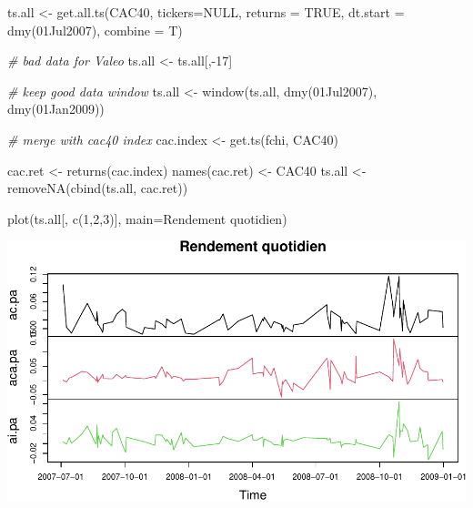 \documentclass[
]{article}
\newenvironment{Shaded}{\begin{snugshade}}{\end{snugshade}}
\newcommand{\AttributeTok}[1]{\textcolor[rgb]{0.77,0.63,0.00}{#1}}
\newcommand{\CommentTok}[1]{\textcolor[rgb]{0.56,0.35,0.01}{\textit{#1}}}
\newcommand{\ConstantTok}[1]{\textcolor[rgb]{0.00,0.00,0.00}{#1}}
\newcommand{\DecValTok}[1]{\textcolor[rgb]{0.00,0.00,0.81}{#1}}
\newcommand{\FunctionTok}[1]{\textcolor[rgb]{0.00,0.00,0.00}{#1}}
\newcommand{\NormalTok}[1]{#1}
\newcommand{\OtherTok}[1]{\textcolor[rgb]{0.56,0.35,0.01}{#1}}
\newcommand{\SpecialCharTok}[1]{\textcolor[rgb]{0.00,0.00,0.00}{#1}}
\newcommand{\StringTok}[1]{\textcolor[rgb]{0.31,0.60,0.02}{#1}}
\begin{document}
\begin{Shaded}
\begin{Highlighting}[]
\NormalTok{  ts.all }\OtherTok{\textless{}{-}} \FunctionTok{get.all.ts}\NormalTok{(}\StringTok{\textquotesingle{}CAC40\textquotesingle{}}\NormalTok{, }\AttributeTok{tickers=}\ConstantTok{NULL}\NormalTok{, }\AttributeTok{returns =} \ConstantTok{TRUE}\NormalTok{,}
    \AttributeTok{dt.start =} \FunctionTok{dmy}\NormalTok{(}\StringTok{\textquotesingle{}01Jul2007\textquotesingle{}}\NormalTok{), }\AttributeTok{combine =}\NormalTok{ T)}
  
  \CommentTok{\# bad data for Valeo}
\NormalTok{  ts.all }\OtherTok{\textless{}{-}}\NormalTok{ ts.all[,}\SpecialCharTok{{-}}\DecValTok{17}\NormalTok{]}
  
  \CommentTok{\# keep good data window}
\NormalTok{  ts.all }\OtherTok{\textless{}{-}} \FunctionTok{window}\NormalTok{(ts.all, }\FunctionTok{dmy}\NormalTok{(}\StringTok{\textquotesingle{}01Jul2007\textquotesingle{}}\NormalTok{), }
                   \FunctionTok{dmy}\NormalTok{(}\StringTok{\textquotesingle{}01Jan2009\textquotesingle{}}\NormalTok{))}
  
  \CommentTok{\# merge with cac40 index}
\NormalTok{  cac.index }\OtherTok{\textless{}{-}} \FunctionTok{get.ts}\NormalTok{(}\StringTok{\textquotesingle{}fchi\textquotesingle{}}\NormalTok{, }\StringTok{\textquotesingle{}CAC40\textquotesingle{}}\NormalTok{)}

\NormalTok{  cac.ret }\OtherTok{\textless{}{-}} \FunctionTok{returns}\NormalTok{(cac.index)}
  \FunctionTok{names}\NormalTok{(cac.ret) }\OtherTok{\textless{}{-}} \StringTok{\textquotesingle{}CAC40\textquotesingle{}}
\NormalTok{  ts.all }\OtherTok{\textless{}{-}} \FunctionTok{removeNA}\NormalTok{(}\FunctionTok{cbind}\NormalTok{(ts.all, cac.ret))}
\end{Highlighting}
\end{Shaded}

\begin{Shaded}
\begin{Highlighting}[]
\FunctionTok{plot}\NormalTok{(ts.all[, }\FunctionTok{c}\NormalTok{(}\DecValTok{1}\NormalTok{,}\DecValTok{2}\NormalTok{,}\DecValTok{3}\NormalTok{)], }\AttributeTok{main=}\StringTok{\textquotesingle{}Rendement quotidien\textquotesingle{}}\NormalTok{)}
\end{Highlighting}
\end{Shaded}

\includegraphics{TP-1_files/figure-latex/plot-cac-1-1.pdf}
\end{document}
